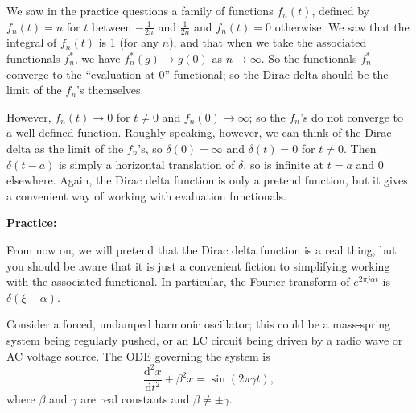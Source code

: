 \documentclass{article}
\newcommand{\deriv}[3][]{\frac{\mathrm{d}^{#1}#2}{\mathrm{d}#3^{#1}}}
\begin{document}
We saw in the practice questions a family of functions $f_n(t)$, defined by $f_n(t)=n$ for $t$ between $-\frac{1}{2n}$ and $\frac{1}{2n}$ and $f_n(t)=0$ otherwise. We saw that the integral of $f_n(t)$ is 1 (for any $n$), and that when we take the associated functionals $f_n^*$, we have $f_n^*(g)\to g(0)$ as $n\to \infty$. So the functionals $f_n^*$ converge to the ``evaluation at 0'' functional; so the Dirac delta should be the limit of the $f_n$'s themselves.

However, $f_n(t)\to 0$ for $t\neq 0$ and $f_n(0)\to \infty$; so the $f_n$'s do not converge to a well-defined function. Roughly speaking, however, we can think of the Dirac delta as the limit of the $f_n$'s, so $\delta(0)=\infty$ and $\delta(t)=0$ for $t\neq 0$. Then $\delta(t-a)$ is simply a horizontal translation of $\delta$, so is infinite at $t=a$ and 0 elsewhere. Again, the Dirac delta function is only a pretend function, but it gives a convenient way of working with evaluation functionals.













\clearpage



\textbf{Practice:}\bigskip

From now on, we will pretend that the Dirac delta function is a real thing, but you should be aware that it is just a convenient fiction to simplifying working with the associated functional. In particular, the Fourier transform of $e^{2\pi j\alpha t}$ is $\delta(\xi-\alpha)$.\bigskip

Consider a forced, undamped harmonic oscillator; this could be a mass-spring system being regularly pushed, or an LC circuit being driven by a radio wave or AC voltage source. The ODE governing the system is
\[\deriv[2]{x}{t}+\beta^2x=\sin(2\pi \gamma t),\]
where $\beta$ and $\gamma$ are real constants and $\beta\neq \pm\gamma$.
\end{document}

